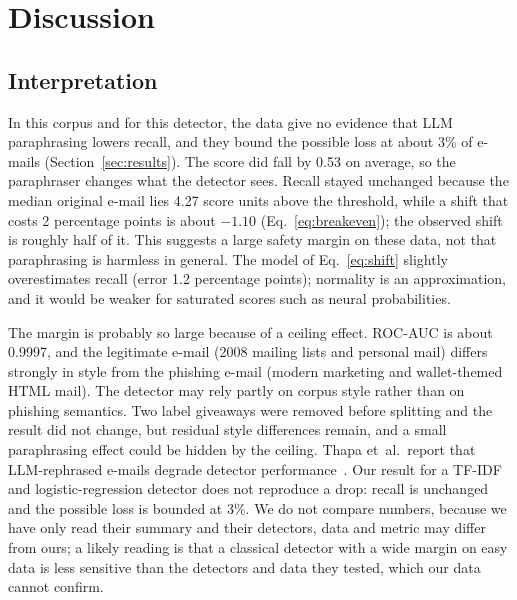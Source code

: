 \section{Discussion}
\label{sec:discussion}

\subsection{Interpretation}
In this corpus and for this detector, the data give no evidence that LLM paraphrasing lowers recall, and they bound the possible loss at about 3\% of e-mails (Section~\ref{sec:results}). The score did fall by 0.53 on average, so the paraphraser changes what the detector sees. Recall stayed unchanged because the median original e-mail lies 4.27 score units above the threshold, while a shift that costs 2 percentage points is about $-1.10$ (Eq.~\eqref{eq:breakeven}); the observed shift is roughly half of it. This suggests a large safety margin on these data, not that paraphrasing is harmless in general. The model of Eq.~\eqref{eq:shift} slightly overestimates recall (error 1.2 percentage points); normality is an approximation, and it would be weaker for saturated scores such as neural probabilities.

The margin is probably so large because of a ceiling effect. ROC-AUC is about 0.9997, and the legitimate e-mail (2008 mailing lists and personal mail) differs strongly in style from the phishing e-mail (modern marketing and wallet-themed HTML mail). The detector may rely partly on corpus style rather than on phishing semantics. Two label giveaways were removed before splitting and the result did not change, but residual style differences remain, and a small paraphrasing effect could be hidden by the ceiling. Thapa et~al.\ report that LLM-rephrased e-mails degrade detector performance~\cite{thapa_phishing_2025}. Our result for a TF-IDF and logistic-regression detector does not reproduce a drop: recall is unchanged and the possible loss is bounded at 3\%. We do not compare numbers, because we have only read their summary and their detectors, data and metric may differ from ours; a likely reading is that a classical detector with a wide margin on easy data is less sensitive than the detectors and data they tested, which our data cannot confirm.

